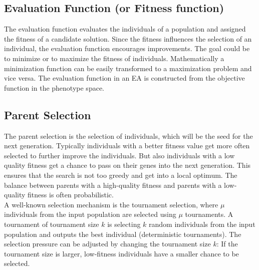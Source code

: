         \subsection{Evaluation Function (or Fitness function)}
        The evaluation function evaluates the individuals of a population and assigned the fitness of a candidate solution. Since the fitness influences the selection of an individual, the evaluation function encourages improvements. The goal could be to minimize or to maximize the fitness of individuals. Mathematically a minimization function can be easily transformed to a maximization problem and vice versa. The evaluation function in an EA is constructed from the objective function in the phenotype space.
        
        \subsection{Parent Selection}
        \label{sec:parentSelection}
        The parent selection is the selection of individuals, which will be the seed for the next generation. Typically individuals with a better fitness value get more often selected to further improve the individuals. But also individuals with a low quality fitness get a chance to pass on their genes into the next generation. This ensures that the search is not too greedy and get into a local optimum. The balance between parents with a high-quality fitness and parents with a low-quality fitness is often probabilistic.\\
        A well-known selection mechanism is the tournament selection, where $\mu$ individuals from the input population are selected using $\mu$ tournaments. A tournament of tournament size $k$ is selecting $k$ random individuals from the input population and outputs the best individual (deterministic tournaments)\cite{Eiben}. The selection pressure can be adjusted by changing the tournament size $k$: If the tournament size is larger, low-fitness individuals have a smaller chance to be selected.
           
